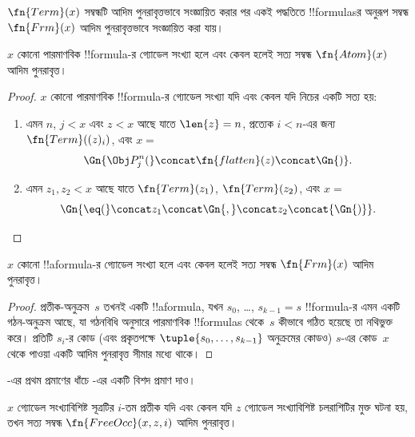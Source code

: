 \documentclass[../../../include/open-logic-section]{subfiles}
\begin{document}

$\fn{Term}(x)$ সম্বন্ধটি আদিম পুনরাবৃত্তভাবে সংজ্ঞায়িত করার পর একই পদ্ধতিতে
!!{formula}sর অনুরূপ সম্বন্ধ $\fn{Frm}(x)$ আদিম পুনরাবৃত্তভাবে সংজ্ঞায়িত
করা যায়।

\begin{prop}
$x$ কোনো পারমাণবিক !!{formula}-র গ্যোডেল সংখ্যা হলে এবং কেবল হলেই সত্য
সম্বন্ধ $\fn{Atom}(x)$ আদিম পুনরাবৃত্ত।
\end{prop}

\begin{proof}
$x$ কোনো পারমাণবিক !!{formula}-র গ্যোডেল সংখ্যা যদি এবং কেবল যদি নিচের
একটি সত্য হয়:
\begin{enumerate}
\item এমন $n$, $j < x$ এবং $z < x$ আছে যাতে $\len{z}=n$, প্রত্যেক $i < n$-এর
  জন্য $\fn{Term}((z)_i)$, এবং $x = $
\[
\Gn{\Obj P^n_j(} \concat \fn{flatten}(z) \concat \Gn{)}.
\]
\item এমন $z_1, z_2 < x$ আছে যাতে $\fn{Term}(z_1)$,
  $\fn{Term}(z_2)$, এবং $x = $
\[
\Gn{{\eq}(} \concat z_1 \concat \Gn{,} \concat z_2 \concat{\Gn{)}}.
\]
\end{enumerate}
\end{proof}

\begin{prop}
$x$ কোনো !!a{formula}-র গ্যোডেল সংখ্যা হলে এবং কেবল হলেই সত্য সম্বন্ধ
$\fn{Frm}(x)$ আদিম পুনরাবৃত্ত।
\end{prop}

\begin{proof}
প্রতীক-অনুক্রম~$s$ তখনই একটি !!a{formula}, যখন $s_0$, \dots,
$s_{k-1} = s$ !!{formula}-র এমন একটি গঠন-অনুক্রম আছে, যা গঠনবিধি অনুসারে
পারমাণবিক !!{formula}s থেকে~$s$ কীভাবে গঠিত হয়েছে তা নথিভুক্ত করে। প্রতিটি
$s_i$-র কোড (এবং প্রকৃতপক্ষে $\tuple{s_0, \dots, s_{k-1}}$ অনুক্রমের কোডও)
$s$-এর কোড~$x$ থেকে পাওয়া একটি আদিম পুনরাবৃত্ত সীমার মধ্যে থাকে।
\end{proof}

\begin{prob}
-এর প্রথম প্রমাণের ধাঁচে
-এর একটি বিশদ প্রমাণ দাও।
\end{prob}

\begin{prop}
$x$ গ্যোডেল সংখ্যাবিশিষ্ট সূত্রটির $i$-তম প্রতীক যদি এবং কেবল যদি
$z$ গ্যোডেল সংখ্যাবিশিষ্ট চলরাশিটির মুক্ত ঘটনা হয়, তখন সত্য সম্বন্ধ
$\fn{FreeOcc}(x, z, i)$ আদিম পুনরাবৃত্ত।
\end{prop}
\end{document}

